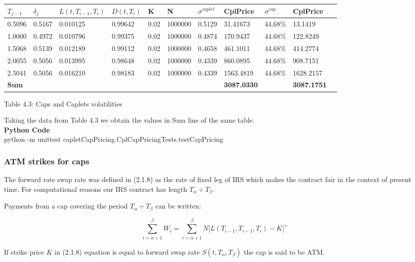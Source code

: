 \documentclass[11pt]{article}
\numberwithin{equation}{subsection}
\begin{document}
\vskip 0.2cm 		
{
	\begin{tabular}{lllllllllll}
		\hline
		\(T_{j-1}\) & \(\delta_{j}\) & \(L(t, T_{i-1}, T_i)\) & \(D(t, T_i)\) & K & N & \(\sigma^{caplet}\) & CplPrice & \( \sigma^{cap} \) & CplPrice  \\		
		\hline
		0.5096 & 0.5167 & 0.010125 & 0.99642 & 0.02 & 1000000 & 0.5129 & 31.41673 & 44.68\% & 13.1419 \\
		1.0000 & 0.4972 & 0.010796 & 0.99375 & 0.02 & 1000000 & 0.4874 & 170.9437 & 44.68\% & 122.8249 \\	
		1.5068 & 0.5139 & 0.012189 & 0.99112 & 0.02 & 1000000 & 0.4658 & 461.1011 & 44.68\% & 414.2774 \\	
		2.0055 & 0.5056 & 0.013995 & 0.98648 & 0.02 & 1000000 & 0.4339 & 860.0895 & 44.68\% & 908.7151 \\	
		2.5041 & 0.5056 & 0.016210 & 0.98183 & 0.02 & 1000000 & 0.4339 & 1563.4819& 44.68\% & 1628.2157 \\	
		\hline				 				
		\textbf{Sum} &  &  &  &  &  &  & \textbf{3087.0330} & & \textbf{3087.1751} \\	
		\hline				 				
	\end{tabular}
	\begin{center}
		Table 4.3: Caps and Caplets volatilities
	\end{center}
}
\vskip 0.4cm

Taking the data from Table 4.3 we obtain the values in Sum line of the same table.\\
\textbf{Python Code}\\
python -m unittest capletCapPricing.CplCapPricingTests.testCapPricing

\newpage
\subsubsection{ATM strikes for caps}
The forward rate swap rate was defined in (2.1.8) as the rate of fixed leg of IRS which makes the contract
fair in the context of present time. For computational reasons our IRS contract has length
\(T_{\alpha} \div T_{\beta}\).

Payments from a cap covering the period \(T_{\alpha} \div T_{\beta}\) can be written: 

\begin{equation*}
\sum_{i=\alpha + 1}^{\beta} W_i = \sum_{i=\alpha + 1}^{\beta} N \big[ L(T_{i-1}, T_{i-1}, T_i) -K\big]^{+}
\end{equation*}

If strike price \(K\) in (2.1.8) equation is equal to forward swap rate \(S(t, T_{\alpha}, T_{\beta})\) the cap is
said to be ATM.\\
\end{document}
